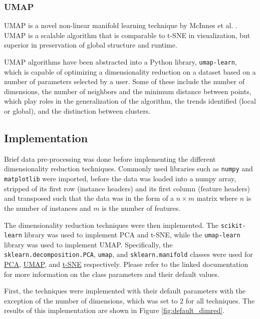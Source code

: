 \documentclass[11pt]{article}
\begin{document}
\subsubsection*{UMAP}
UMAP is a novel non-linear manifold learning technique by McInnes et al. \cite{mcinnes_umap_2020}. UMAP is a scalable algorithm that is comparable to t-SNE in visualization, but superior in preservation of global structure and runtime.

UMAP algorithms have been abstracted into a Python library, \verb|umap-learn|, which is capable of optimizing a dimensionality reduction on a dataset based on a number of parameters selected by a user. Some of these include the number of dimensions, the number of neighbors and the minimum distance between points, which play roles in the generalization of the algorithm, the trends identified (local or global), and the distinction between clusters.

\subsection{Implementation}
Brief data pre-processing was done before implementing the different dimensionality reduction techniques. Commonly used libraries such as \verb|numpy| and \verb|matplotlib| were imported, before the data was loaded into a numpy array, stripped of its first row (instance headers) and its first column (feature headers) and transposed such that the data was in the form of a $n \times m$ matrix where $n$ is the number of instances and $m$ is the number of features.

The dimensionality reduction techniques were then implemented. The \verb|scikit-learn| library was used to implement PCA and t-SNE, while the \verb|umap-learn| library was used to implement UMAP. Specifically, the \verb|sklearn.decomposition.PCA|, \verb|umap|, and \verb|sklearn.manifold| classes were used for \href{https://scikit-learn.org/stable/modules/generated/sklearn.decomposition.PCA.html}{PCA}, \href{https://umap-learn.readthedocs.io/en/latest/parameters.html}{UMAP}, and \href{https://scikit-learn.org/stable/modules/generated/sklearn.manifold.TSNE.html}{t-SNE} respectively. Please refer to the linked documentation for more information on the class parameters and their default values.

First, the techniques were implemented with their default parameters with the exception of the number of dimensions, which was set to 2 for all techniques. The results of this implementation are shown in Figure \ref{fig:default_dimred}.
\end{document}

